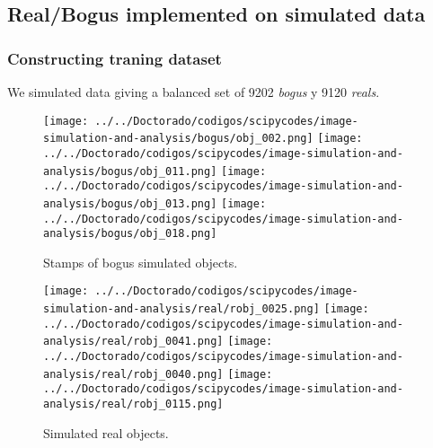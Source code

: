\documentclass[10pt]{beamer}
\begin{document}
\subsection{Real/Bogus implemented on simulated data}
\begin{frame}\frametitle{Constructing traning dataset}
We simulated data giving a balanced set of 9202 \textit{bogus} y 9120 \textit{reals}.
\begin{figure}
 \centering
 \texttt{[image: ../../Doctorado/codigos/scipycodes/image-simulation-and-analysis/bogus/obj\_002.png]}
 \texttt{[image: ../../Doctorado/codigos/scipycodes/image-simulation-and-analysis/bogus/obj\_011.png]}
 \texttt{[image: ../../Doctorado/codigos/scipycodes/image-simulation-and-analysis/bogus/obj\_013.png]}
 \texttt{[image: ../../Doctorado/codigos/scipycodes/image-simulation-and-analysis/bogus/obj\_018.png]}
 \caption{Stamps of bogus simulated objects.}
 \label{fig:bogus}
\end{figure}
\begin{figure}
 \centering
 \texttt{[image: ../../Doctorado/codigos/scipycodes/image-simulation-and-analysis/real/robj\_0025.png]}
 \texttt{[image: ../../Doctorado/codigos/scipycodes/image-simulation-and-analysis/real/robj\_0041.png]}
 \texttt{[image: ../../Doctorado/codigos/scipycodes/image-simulation-and-analysis/real/robj\_0040.png]}
 \texttt{[image: ../../Doctorado/codigos/scipycodes/image-simulation-and-analysis/real/robj\_0115.png]}
 \caption{Simulated real objects.}
 \label{fig:reals}
\end{figure}
\end{frame}
\end{document}
